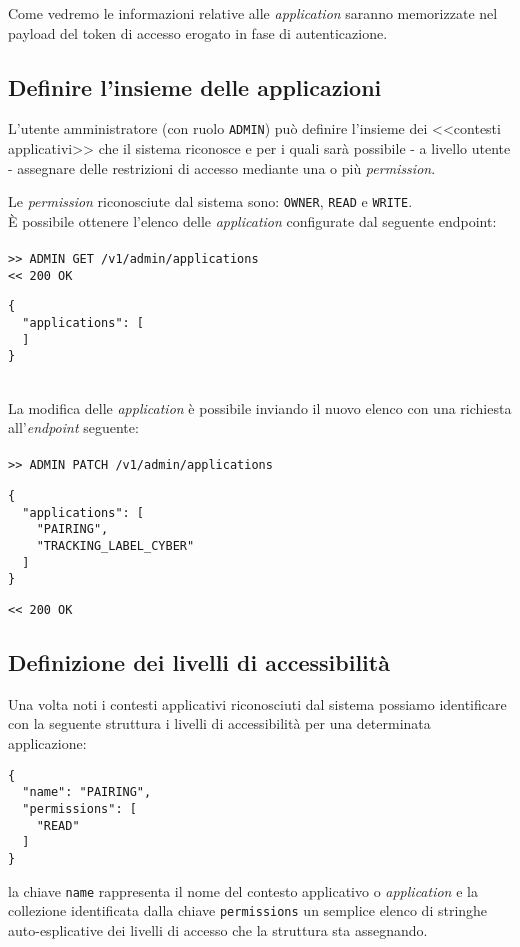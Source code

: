 \documentclass[a4paper,12pt]{article}
\begin{document}
Come vedremo le informazioni relative alle \textit{application} saranno memorizzate nel payload del token di accesso erogato in fase di autenticazione.

\subsection{Definire l'insieme delle applicazioni}
L'utente amministratore (con ruolo \texttt{ADMIN}) può definire l'insieme dei <<contesti applicativi>> che il sistema riconosce e per i quali sarà possibile - a livello utente - assegnare delle restrizioni di accesso mediante una o più \textit{permission}.	

Le \textit{permission} riconosciute dal sistema sono: \texttt{OWNER}, \texttt{READ} e \texttt{WRITE}. \\

È possibile ottenere l'elenco delle \textit{application} configurate dal seguente endpoint:\\
\\
\texttt{>> ADMIN GET /v1/admin/applications}\\
\texttt{<< 200 OK}
\begin{lstlisting}
{
  "applications": [
  ]
}
\end{lstlisting} \\

La modifica delle \textit{application} è possibile inviando il nuovo elenco con una richiesta all'\textit{endpoint} seguente:\\
\\
\texttt{>> ADMIN PATCH /v1/admin/applications}
\begin{lstlisting}
{
  "applications": [
    "PAIRING",
    "TRACKING_LABEL_CYBER"
  ]
}
\end{lstlisting}
\texttt{<< 200 OK}

\subsection{Definizione dei livelli di accessibilità}
Una volta noti i contesti applicativi riconosciuti dal sistema possiamo identificare con la seguente struttura i livelli di accessibilità per una determinata applicazione: \\

\begin{lstlisting}
{
  "name": "PAIRING",
  "permissions": [
    "READ"
  ]
}
\end{lstlisting}


la chiave \texttt{name} rappresenta il nome del contesto applicativo o \textit{application} e la collezione identificata dalla chiave \texttt{permissions} un semplice elenco di stringhe auto-esplicative dei livelli di accesso che la struttura sta assegnando.
\end{document}
